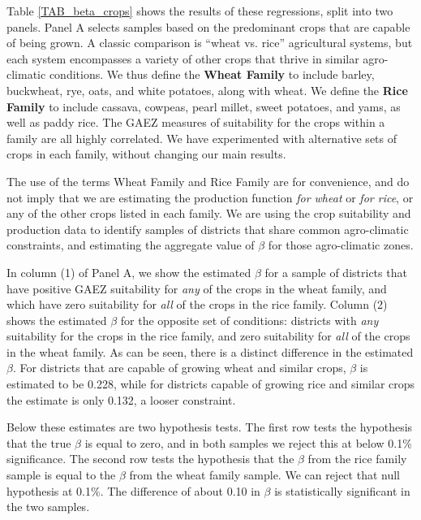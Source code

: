 \documentclass[11pt]{article}
\begin{document}
Table \ref{TAB_beta_crops} shows the results of these regressions, split into two panels. Panel A selects samples based on the predominant crops that are capable of being grown. A classic comparison is ``wheat vs. rice'' agricultural systems, but each system encompasses a variety of other crops that thrive in similar agro-climatic conditions. We thus define the \textbf{Wheat Family} to include barley, buckwheat, rye, oats, and white potatoes, along with wheat. We define the \textbf{Rice Family} to include cassava, cowpeas, pearl millet, sweet potatoes, and yams, as well as paddy rice. The GAEZ measures of suitability for the crops within a family are all highly correlated. We have experimented with alternative sets of crops in each family, without changing our main results. 

The use of the terms Wheat Family and Rice Family are for convenience, and do not imply that we are estimating the production function \textit{for wheat} or \textit{for rice}, or any of the other crops listed in each family. We are using the crop suitability and production data to identify samples of districts that share common agro-climatic constraints, and estimating the aggregate value of $\beta$ for those agro-climatic zones.

In column (1) of Panel A, we show the estimated $\beta$ for a sample of districts that have positive GAEZ suitability for \textit{any} of the crops in the wheat family, and which have zero suitability for \textit{all} of the crops in the rice family. Column (2) shows the estimated $\beta$ for the opposite set of conditions: districts with \textit{any} suitability for the crops in the rice family, and zero suitability for \textit{all} of the crops in the wheat family. As can be seen, there is a distinct difference in the estimated $\beta$. For districts that are capable of growing wheat and similar crops, $\beta$ is estimated to be 0.228, while for districts capable of growing rice and similar crops the estimate is only 0.132, a looser constraint.

Below these estimates are two hypothesis tests. The first row tests the hypothesis that the true $\beta$ is equal to zero, and in both samples we reject this at below 0.1\% significance. The second row tests the hypothesis that the $\beta$ from the rice family sample is equal to the $\beta$ from the wheat family sample. We can reject that null hypothesis at 0.1\%. The difference of about 0.10 in $\beta$ is statistically significant in the two samples.
\end{document}
